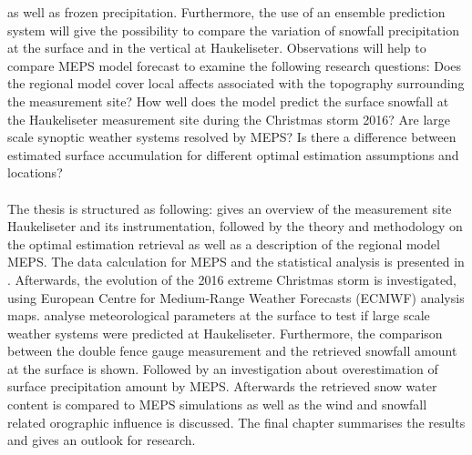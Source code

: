 as well as frozen precipitation. Furthermore, the use of an ensemble prediction system will give the possibility to compare the variation of snowfall precipitation at the surface and in the vertical at Haukeliseter. Observations will help to compare MEPS model forecast to examine the following research questions: 
Does the regional model cover local affects associated with the topography surrounding the measurement site? How well does the model predict the surface snowfall at the Haukeliseter measurement site during the Christmas storm 2016? 
Are large scale synoptic weather systems resolved by MEPS?
Is there a difference between estimated surface accumulation for different optimal estimation assumptions and locations? 
\\
\\
The thesis is structured as following: %
 gives an overview of the measurement site Haukeliseter and its instrumentation, followed by the theory and methodology on the optimal estimation retrieval as well as a description of the regional model MEPS. The data calculation for MEPS and the statistical analysis is presented in .
Afterwards, the evolution of the 2016 extreme Christmas storm is investigated, using European Centre for Medium-Range Weather Forecasts (ECMWF) analysis maps.
 analyse meteorological parameters at the surface to test if large scale weather systems were predicted at Haukeliseter.
Furthermore, %
the comparison between the double fence gauge measurement and the retrieved snowfall amount at the surface is shown. Followed by an investigation about overestimation of surface precipitation amount by MEPS. Afterwards the retrieved snow water content is compared to MEPS simulations as well as the wind and snowfall related orographic influence is discussed.
The final chapter summarises the results and gives an outlook for research.
